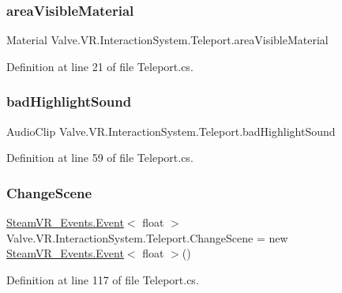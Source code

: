 \subsubsection{\texorpdfstring{areaVisibleMaterial}{areaVisibleMaterial}}
{\footnotesize\ttfamily Material Valve.\+V\+R.\+Interaction\+System.\+Teleport.\+area\+Visible\+Material}



Definition at line 21 of file Teleport.\+cs.

\mbox{\label{class_valve_1_1_v_r_1_1_interaction_system_1_1_teleport_a95a063bba4876e5ed9c2fcca5e7e7470}} 
\subsubsection{\texorpdfstring{badHighlightSound}{badHighlightSound}}
{\footnotesize\ttfamily Audio\+Clip Valve.\+V\+R.\+Interaction\+System.\+Teleport.\+bad\+Highlight\+Sound}



Definition at line 59 of file Teleport.\+cs.

\mbox{\label{class_valve_1_1_v_r_1_1_interaction_system_1_1_teleport_af99d76ad52736e0fb59a308c4ead39fb}} 
\subsubsection{\texorpdfstring{ChangeScene}{ChangeScene}}
{\footnotesize\ttfamily \mbox{\hyperlink{class_valve_1_1_v_r_1_1_steam_v_r___events_1_1_event}{Steam\+V\+R\+\_\+\+Events.\+Event}}$<$ float $>$ Valve.\+V\+R.\+Interaction\+System.\+Teleport.\+Change\+Scene = new \mbox{\hyperlink{class_valve_1_1_v_r_1_1_steam_v_r___events_1_1_event}{Steam\+V\+R\+\_\+\+Events.\+Event}}$<$ float $>$()\hspace{0.3cm}{\ttfamily [static]}}



Definition at line 117 of file Teleport.\+cs.

